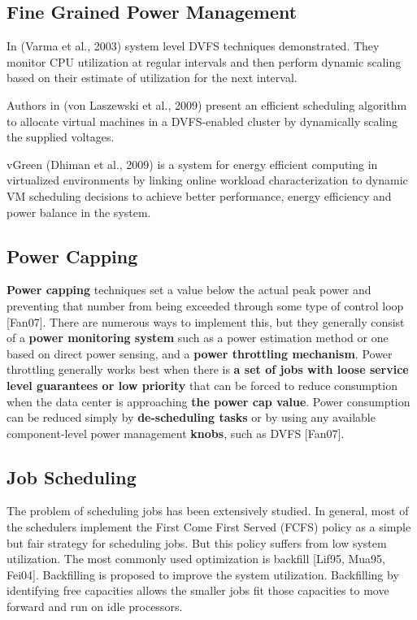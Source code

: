 \documentclass{llncs}
\begin{document}
\subsection{Fine Grained Power Management}
In (Varma et al., 2003) system level DVFS techniques demonstrated. They
monitor CPU utilization at regular intervals and then perform dynamic
scaling based on their estimate of utilization for the next interval.

Authors in (von Laszewski et al., 2009) present an efficient scheduling
algorithm to allocate virtual machines in a DVFS-enabled cluster by
dynamically scaling the supplied voltages.

vGreen (Dhiman et al., 2009) is a system for energy efficient computing in
virtualized environments by linking online workload characterization to
dynamic VM scheduling decisions to achieve better performance, energy
efficiency and power balance in the system.

\subsection{Power Capping}

\textbf{Power capping }techniques set a value below the actual peak power
and preventing that number from being exceeded through some type of control
loop [Fan07]. There are numerous ways to implement this, but they generally
consist of a \textbf{power monitoring system }such as a power estimation
method or one based on direct power sensing, and a \textbf{power throttling
mechanism}. Power throttling generally works best when there is \textbf{a
set of jobs with loose service level guarantees or low priority }that can be
forced to reduce consumption when the data center is approaching \textbf{the
power cap value}. Power consumption can be reduced simply by
\textbf{de-scheduling tasks }or by using any available component-level power
management \textbf{knobs}, such as DVFS [Fan07].

\subsection{Job Scheduling}
The problem of scheduling jobs has been extensively studied. In general,
most of the schedulers implement the First Come First Served (FCFS) policy
as a simple but fair strategy for scheduling jobs. But this policy suffers
from low system utilization. The most commonly used optimization is backfill
[Lif95, Mua95, Fei04]. Backfilling is proposed to improve the system
utilization. Backfilling by identifying free capacities allows the smaller
jobs fit those capacities to move forward and run on idle processors.
\end{document}
